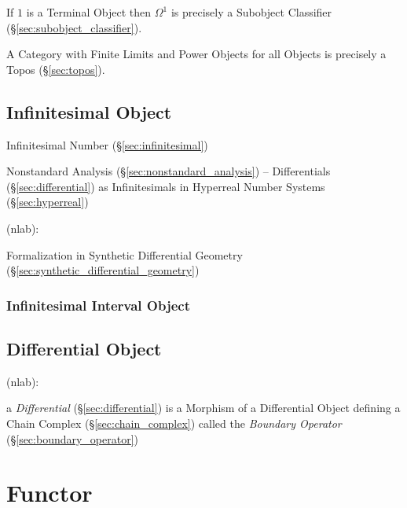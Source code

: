 If $1$ is a Terminal Object then $\Omega^1$ is precisely a Subobject
Classifier (\S\ref{sec:subobject_classifier}).

A Category with Finite Limits and Power Objects for all Objects is
precisely a Topos (\S\ref{sec:topos}).



\subsection{Infinitesimal Object}\label{sec:infinitesimal_object}

\fist Infinitesimal Number (\S\ref{sec:infinitesimal})

\fist Nonstandard Analysis (\S\ref{sec:nonstandard_analysis}) -- Differentials
(\S\ref{sec:differential}) as Infinitesimals in
Hyperreal Number Systems (\S\ref{sec:hyperreal})

(nlab):

Formalization in Synthetic Differential Geometry
(\S\ref{sec:synthetic_differential_geometry})



\subsubsection{Infinitesimal Interval Object}
\label{sec:infinitesimal_interval_object}



\subsection{Differential Object}\label{sec:differential_object}

(nlab):

\fist a \emph{Differential} (\S\ref{sec:differential}) is a Morphism of a
Differential Object defining a Chain Complex (\S\ref{sec:chain_complex}) called
the \emph{Boundary Operator} (\S\ref{sec:boundary_operator})



\section{Functor}\label{sec:functor}

